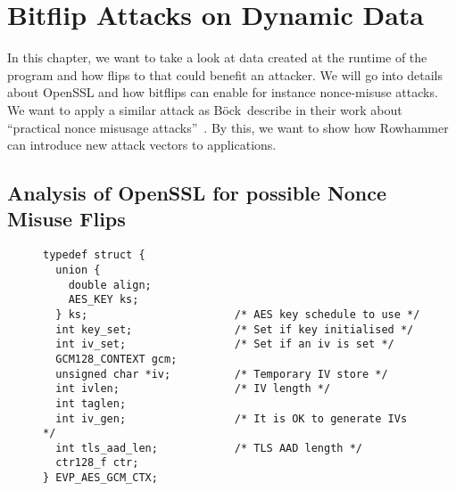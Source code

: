 \chapter{Bitflip Attacks on Dynamic Data}\label{sec:dynattack}

In this chapter, we want to take a look at data created at the runtime of the
program and how flips to that could benefit an attacker. We will go into details
about OpenSSL and how bitflips can enable for instance nonce-misuse attacks. We
want to apply a similar attack as Böck~\etal describe in their work about
``practical nonce misusage attacks''~\cite{gcmnonceattack}. By this, we want to
show how Rowhammer can introduce new attack vectors to applications.

\section{Analysis of OpenSSL for possible Nonce Misuse Flips}

\begin{figure}
\begin{minipage}{\linewidth}
\begin{lstlisting}[style=CStyle,
                   caption={Struct used by OpenSSL to describe the AES-GCM
context. The IV used is stored in the memory pointed to by \texttt{iv}. Source
is taken from OpenSSL version $1.1.0g$},
                   label={lst:aesstruct}]
typedef struct {
  union {
    double align;
    AES_KEY ks;
  } ks;                       /* AES key schedule to use */
  int key_set;                /* Set if key initialised */
  int iv_set;                 /* Set if an iv is set */
  GCM128_CONTEXT gcm;
  unsigned char *iv;          /* Temporary IV store */
  int ivlen;                  /* IV length */
  int taglen;
  int iv_gen;                 /* It is OK to generate IVs */
  int tls_aad_len;            /* TLS AAD length */
  ctr128_f ctr;
} EVP_AES_GCM_CTX;
\end{lstlisting}
\end{minipage}
\end{figure}

